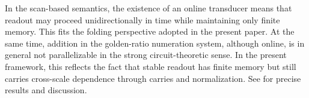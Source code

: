 \begin{remark}\label{rem:online-not-parallel}
In the scan-based semantics, the existence of an online transducer means that readout may proceed unidirectionally in time while maintaining only finite memory. This fits the folding perspective adopted in the present paper. At the same time, addition in the golden-ratio numeration system, although online, is in general not parallelizable in the strong circuit-theoretic sense. In the present framework, this reflects the fact that stable readout has finite memory but still carries cross-scale dependence through carries and normalization. See \cite{Frougny1999OnlineAddition} for precise results and discussion.
\end{remark}
